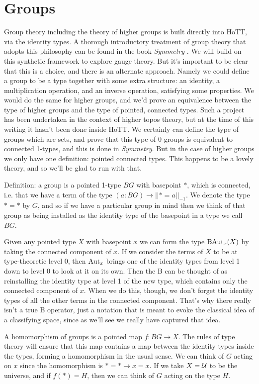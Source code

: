 \documentclass[12pt]{extarticle}
\begin{document}
\section{Groups}
Group theory including the theory of higher groups is built directly into HoTT, via the identity types. A thorough introductory treatment of group theory that adopts this philosophy can be found in the book \emph{Symmetry} \cite{Symmetry}. We will build on this synthetic framework to explore gauge theory. But it's important to be clear that this is a choice, and there is an alternate approach. Namely we could define a group to be a type together with some extra structure: an identity, a multiplication operation, and an inverse operation, satisfying some properties. We would do the same for higher groups, and we'd prove an equivalence between the type of higher groups and the type of pointed, connected types. Such a project has been undertaken in the context of higher topos theory, but at the time of this writing it hasn't been done inside HoTT. We certainly can define the type of groups which are sets, and prove that this type of 0-groups is equivalent to connected 1-types, and this is done in \emph{Symmetry}. But in the case of higher groups we only have one definition: pointed connected types. This happens to be a lovely theory, and so we'll be glad to run with that.

Definition: a group is a pointed 1-type $BG$ with basepoint $*$, which is connected, i.e. that we have a term of the type $(a:BG)\to||*=a||_{-1}$. We denote the type $*=*$ by $G$, and so if we have a particular group in mind then we think of that group as being installed as the identity type of the basepoint in a type we call $BG$.

Given any pointed type $X$ with basepoint $x$ we can form the type $\mathrm{BAut}_x(X)$ by taking the connected component of $x$. If we consider the terms of $X$ to be at type-theoretic level 0, then $\mathrm{Aut}_x$ brings one of the identity types from level 1 down to level 0 to look at it on its own. Then the B can be thought of as reinstalling the identity type at level 1 of the new type, which contains only the connected component of $x$. When we do this, though, we don't forget the identity types of all the other terms in the connected component. That's why there really isn't a true B operator, just a notation that is meant to evoke the classical idea of a classifying space, since as we'll see we really have captured that idea.

A homomorphism of groups is a pointed map $f:BG\to X$. The rules of type theory will ensure that this map contains a map between the identity types inside the types, forming a homomorphism in the usual sense. We can think of $G$ acting on $x$ since the homomorphism is $*=*\to x=x$. If we take $X=\mathcal{U}$ to be the universe, and if $f(*)=H$, then we can think of $G$ acting on the type $H$.
\end{document}
